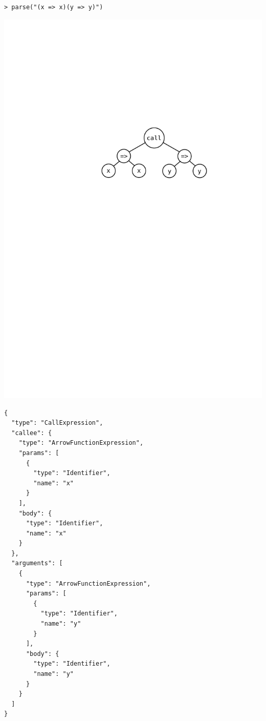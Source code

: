 \documentclass[12pt, oneside]{book}
\begin{document}
\begin{verbatim}
> parse("(x => x)(y => y)")
\end{verbatim}
\includegraphics{images/data-structures-to-represent-yocto-javascript-programs/call.pdf}
\begin{verbatim}
{
  "type": "CallExpression",
  "callee": {
    "type": "ArrowFunctionExpression",
    "params": [
      {
        "type": "Identifier",
        "name": "x"
      }
    ],
    "body": {
      "type": "Identifier",
      "name": "x"
    }
  },
  "arguments": [
    {
      "type": "ArrowFunctionExpression",
      "params": [
        {
          "type": "Identifier",
          "name": "y"
        }
      ],
      "body": {
        "type": "Identifier",
        "name": "y"
      }
    }
  ]
}
\end{verbatim}
\end{document}

